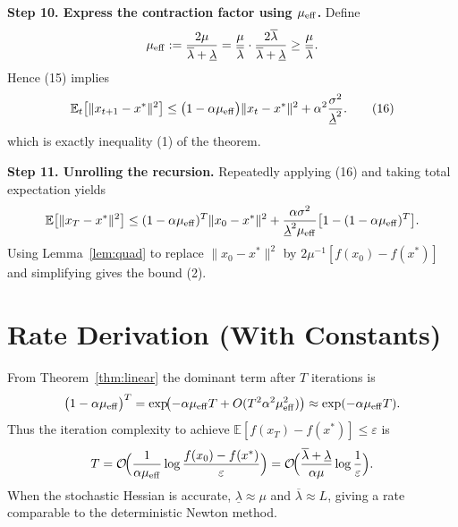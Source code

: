 \documentclass{article}
\begin{document}
\bigskip
\noindent\textbf{Step 10. Express the contraction factor using $\mu_{\rm eff}$.}
Define
\[
\mu_{\rm eff}:=
\frac{2\mu}{\overline{\lambda}+\underline{\lambda}}
= \frac{\mu}{\overline{\lambda}}\cdot\frac{2\overline{\lambda}}{\overline{\lambda}+\underline{\lambda}}
\ge \frac{\mu}{\overline{\lambda}}.
\]
Hence (15) implies
\[
\mathbb{E}_{t}\bigl[\|x_{t+1}-x^{*}\|^{2}\bigr]
\le
\bigl(1-\alpha\mu_{\rm eff}\bigr)\|x_{t}-x^{*}\|^{2}
+\alpha^{2}\frac{\sigma^{2}}{\underline{\lambda}^{2}}. \tag{16}
\]
which is exactly inequality (1) of the theorem.  \hfill\qedsymbol

\bigskip
\noindent\textbf{Step 11. Unrolling the recursion.}
Repeatedly applying (16) and taking total expectation yields
\[
\mathbb{E}\bigl[\|x_{T}-x^{*}\|^{2}\bigr]
\le (1-\alpha\mu_{\rm eff})^{T}\|x_{0}-x^{*}\|^{2}
+\frac{\alpha\sigma^{2}}{\underline{\lambda}^{2}\mu_{\rm eff}}
\bigl[1-(1-\alpha\mu_{\rm eff})^{T}\bigr].
\]
Using Lemma~\ref{lem:quad} to replace $\|x_{0}-x^{*}\|^{2}$ by
$2\mu^{-1}[f(x_{0})-f(x^{*})]$ and simplifying gives the bound (2). \hfill\qedsymbol

\section*{Rate Derivation (With Constants)}
From Theorem~\ref{thm:linear} the dominant term after $T$ iterations is
\[
\bigl(1-\alpha\mu_{\rm eff}\bigr)^{T}
=
\exp\!\bigl(-\alpha\mu_{\rm eff}T + O(T^{2}\alpha^{2}\mu_{\rm eff}^{2})\bigr)
\approx \exp(-\alpha\mu_{\rm eff}T).
\]
Thus the iteration complexity to achieve
$\mathbb{E}[f(x_{T})-f(x^{*})]\le\varepsilon$ is
\[
T = \mathcal{O}\!\Bigl(\frac{1}{\alpha\mu_{\rm eff}}
\log\frac{f(x_{0})-f(x^{*})}{\varepsilon}\Bigr)
=
\mathcal{O}\!\Bigl(\frac{\overline{\lambda}+\underline{\lambda}}{\alpha\mu}
\log\frac{1}{\varepsilon}\Bigr).
\]
When the stochastic Hessian is accurate, $\underline{\lambda}\approx\mu$ and
$\overline{\lambda}\approx L$, giving a rate comparable to the deterministic
Newton method.

\end{document}
